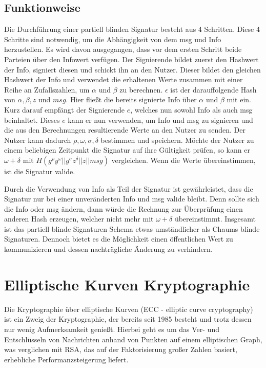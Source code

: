 \documentclass{scrreprt}
\begin{document}
\subsection{Funktionweise}
Die Durchführung einer partiell blinden Signatur besteht aus 4 Schritten. Diese 4 Schritte sind notwendig, um die Abhängigkeit von dem msg und Info herzustellen. Es wird davon ausgegangen, dass vor dem ersten Schritt beide Parteien über den Infowert verfügen. Der Signierende bildet zuerst den Hashwert der Info, signiert diesen und schickt ihn an den Nutzer. Dieser bildet den gleichen Hashwert der Info und verwendet die erhaltenen Werte zusammen mit einer Reihe an Zufallszahlen, um $\alpha$ und $\beta$ zu berechnen. $\epsilon$ ist der darauffolgende Hash von $\alpha,\beta,z$ und $msg$. Hier fließt die bereits signierte Info über $\alpha$ und $\beta$ mit ein. Kurz darauf empfängt der Signierende $e$, welches nun sowohl Info als auch msg beinhaltet. Dieses $e$ kann er nun verwenden, um Info und msg zu signieren und die aus den Berechnungen resultierende Werte an den Nutzer zu senden. Der Nutzer kann dadurch $\rho,\omega,\sigma,\delta$ bestimmen und speichern. Möchte der Nutzer zu einem beliebigen Zeitpunkt die Signatur auf ihre Gültigkeit prüfen, so kann er $\omega + \delta$ mit  $H (g^\rho y^\omega || g^\sigma z^\delta || z || msg)$ vergleichen. Wenn die Werte übereinstimmen, ist die Signatur valide.

Durch die Verwendung von Info als Teil der Signatur ist gewährleistet, dass die Signatur nur bei einer unveränderten Info und msg valide bleibt. Denn sollte sich die Info oder msg ändern, dann würde die Rechnung zur Überprüfung einen anderen Hash erzeugen, welcher nicht mehr mit $\omega+\delta$ übereinstimmt. Insgesamt ist das partiell blinde Signaturen Schema etwas umständlicher als Chaums blinde Signaturen. Dennoch bietet es die Möglichkeit einen öffentlichen Wert zu kommunizieren und dessen nachträgliche Änderung zu verhindern.


\section{Elliptische Kurven Kryptographie}
\label{sec:ecc}
Die Kryptographie über elliptische Kurven (ECC - elliptic curve cryptography) ist ein Zweig der Kryptographie, der bereits seit 1985 besteht \cite{ecc-miller1985use} und trotz dessen nur wenig Aufmerksamkeit genießt. Hierbei geht es um das Ver- und Entschlüsseln von Nachrichten anhand von Punkten auf einem elliptischen Graph, was verglichen mit RSA, das auf der Faktorisierung großer Zahlen basiert, erhebliche Performanzsteigerung liefert.
\end{document}
